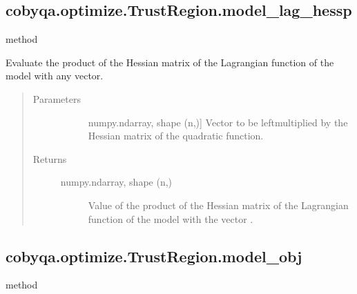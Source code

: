 \documentclass[letterpaper,10pt,english]{sphinxmanual}
\begin{document}
\begin{fulllineitems}
\subsection{cobyqa.optimize.TrustRegion.model\_lag\_hessp}
\label{\detokenize{refs/generated/cobyqa.optimize.TrustRegion.model_lag_hessp:cobyqa-optimize-trustregion-model-lag-hessp}}\label{\detokenize{refs/generated/cobyqa.optimize.TrustRegion.model_lag_hessp::doc}}
\sphinxAtStartPar
method

\begin{fulllineitems}
\label{\detokenize{refs/generated/cobyqa.optimize.TrustRegion.model_lag_hessp:cobyqa.optimize.TrustRegion.model_lag_hessp}}
\sphinxAtStartPar
Evaluate the product of the Hessian matrix of the Lagrangian function of
the model with any vector.
\begin{quote}\begin{description}
\item[{Parameters}] \leavevmode\begin{description}
\item[{}] \leavevmode{[}numpy.ndarray, shape (n,){]}
\sphinxAtStartPar
Vector to be left\sphinxhyphen{}multiplied by the Hessian matrix of the quadratic
function.

\end{description}

\item[{Returns}] \leavevmode\begin{description}
\item[{numpy.ndarray, shape (n,)}] \leavevmode
\sphinxAtStartPar
Value of the product of the Hessian matrix of the Lagrangian
function of the model with the vector .

\end{description}

\end{description}\end{quote}

\end{fulllineitems}



\subsection{cobyqa.optimize.TrustRegion.model\_obj}
\label{\detokenize{refs/generated/cobyqa.optimize.TrustRegion.model_obj:cobyqa-optimize-trustregion-model-obj}}\label{\detokenize{refs/generated/cobyqa.optimize.TrustRegion.model_obj::doc}}
\sphinxAtStartPar
method


\end{fulllineitems}
\end{document}
